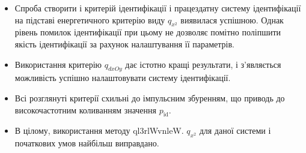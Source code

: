 \begin{itemize}

  \item
    Спроба створити і критерій ідентифікації і працездатну систему
    ідентифікації на підставі енергетичного критерію виду
    $ q_{x^2} $ виявилася успішною. Однак рівень помилок ідентифікації
    при цьому не дозволяє помітно поліпшити якість ідентифікації
    за рахунок налаштування її параметрів.

  \item
    Використання критерію
    $ q_{dxOy} $ дає істотно кращі результати, і з'являється можливість
    успішно налаштовувати систему ідентифікації.

  \item
    Всі розглянуті критерії схильні до імпульсним збуренням, що
    приводь до високочастотним коливанням значення
    $ p_{\mathrm{id}} $.

  \item
    В цілому, використання методу ql3rlWvnleW.
    $ q_{x^2} $ для даної системи і початкових умов найбільш виправдано.

\end{itemize}




